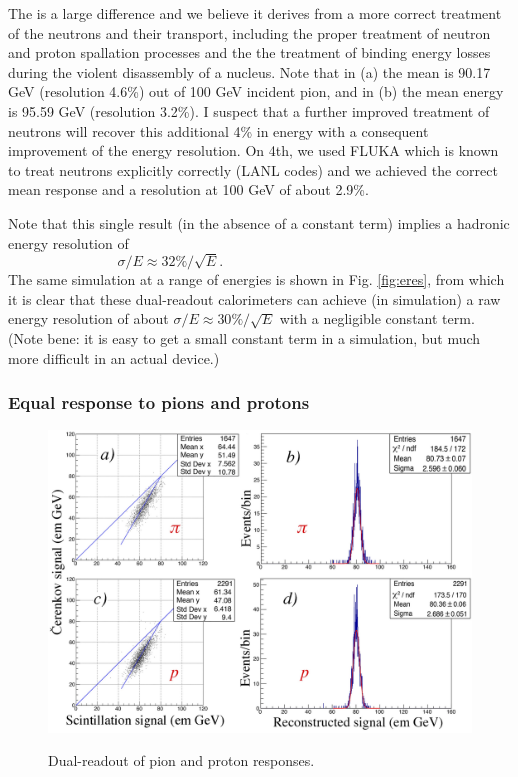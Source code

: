 The is a large difference and we believe it derives from a more correct treatment of the neutrons and their transport, including the proper treatment of neutron and proton spallation processes and the the treatment of binding energy losses during the violent disassembly of a nucleus.   Note that in (a) the mean is 90.17 GeV (resolution 4.6\%) out of 100 GeV incident pion, and in (b) the mean energy is 95.59 GeV (resolution 3.2\%).  I suspect that a further improved treatment of neutrons will recover this additional 4\% in energy with a consequent improvement of the energy resolution.   On 4th, we used FLUKA which is known to treat neutrons explicitly correctly (LANL codes) and we achieved the correct mean response and a resolution at 100 GeV of about 2.9\%.

Note that this single result (in the absence of a constant term) implies a hadronic energy resolution of
\begin{displaymath}
  \sigma / E \approx 32\% / \sqrt{E}.  ~~~~~~~~~~~~~~~~~~~~~~~~~~~~~~~~~~~~~~~~~~~~~~~~~~~~~~~~~~
\end{displaymath}
The same simulation at a range of energies is shown in Fig. \ref{fig:eres}, from which it is clear that these dual-readout calorimeters can achieve (in simulation) a raw energy resolution of about $\sigma/E \approx 30\% / \sqrt{E}$ with a negligible constant term.  (Note bene:  it is easy to get a small constant term in a simulation, but much more difficult in an actual device.)



\subsubsection{Equal response to pions and protons}     \label{sec:pi-p}



\begin{figure}
 \centering
 \includegraphics[scale=0.09]{Calorimeter/DualReadout/f42-pion-proton.jpg}
 \label{fig:pi-p}
 \caption{Dual-readout of pion and proton responses.}
\end{figure}



